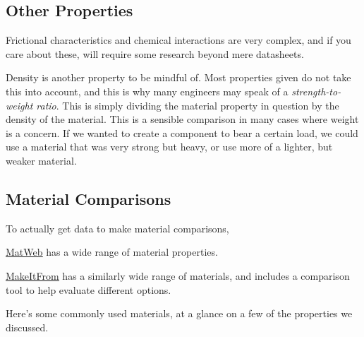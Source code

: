 \documentclass[10pt,letterpaper]{book}
\begin{document}
\subsection{Other Properties} 
 
 Frictional characteristics and chemical interactions are very complex, and if you care about these, will require some research beyond mere datasheets.
 
 Density is another property to be mindful of. Most properties given do not take this into account, and this is why many engineers may speak of a \textit{strength-to-weight ratio}. This is simply dividing the material property in question by the density of the material. This is a sensible comparison in many cases where weight is a concern. If we wanted to create a component to bear a certain load, we could use a material that was very strong but heavy, or use more of a lighter, but weaker material.
 
 \subsection{Material Comparisons}
 
 To actually get data to make material comparisons,
 \begin{asparaitem}
 	\item \href{http://www.matweb.com/search/DataSheet.aspx?MatGUID=3a2e111b27ef4e5d813bad6044b3f318&ckck=1}{\color{red}\underline{MatWeb}} has a wide range of material properties.
 	\item \href{https://www.makeitfrom.com/}{\color{red}\underline{MakeItFrom}} has a similarly wide range of materials, and includes a comparison tool to help evaluate different options.
 \end{asparaitem}
 
 Here's some commonly used materials, at a glance on a few of the properties we discussed.
 
\end{document}
